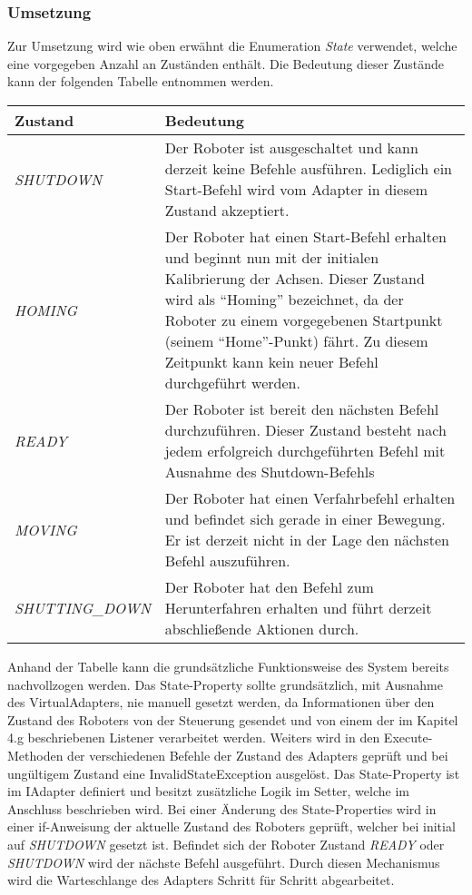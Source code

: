 \subsubsection{Umsetzung}
Zur Umsetzung wird wie oben erwähnt die Enumeration \textit{State} verwendet, welche eine vorgegeben Anzahl an Zuständen enthält. Die Bedeutung dieser Zustände kann der folgenden Tabelle entnommen werden.
\newline
\begin{tabular}{|p{4cm}|p{10cm}|}
\hline \rowcolor{lightgray}
\textbf{Zustand} & \textbf{Bedeutung}\\
\hline
\textit{SHUTDOWN} & Der Roboter ist ausgeschaltet und kann derzeit keine Befehle ausführen. Lediglich ein Start-Befehl wird vom Adapter in diesem Zustand akzeptiert.\\
\hline
\textit{HOMING} & Der Roboter hat einen Start-Befehl erhalten und beginnt nun mit der initialen Kalibrierung der Achsen. Dieser Zustand wird als “Homing” bezeichnet, da der Roboter zu einem vorgegebenen Startpunkt (seinem “Home”-Punkt) fährt. Zu diesem Zeitpunkt kann kein neuer Befehl durchgeführt werden.\\
\hline
\textit{READY} & Der Roboter ist bereit den nächsten Befehl durchzuführen. Dieser Zustand besteht nach jedem erfolgreich durchgeführten Befehl mit Ausnahme des Shutdown-Befehls \\
\hline
\textit{MOVING} & Der Roboter hat einen Verfahrbefehl erhalten und befindet sich gerade in einer Bewegung. Er ist derzeit nicht in der Lage den nächsten Befehl auszuführen.\\
\hline
\textit{SHUTTING\_DOWN} & Der Roboter hat den Befehl zum Herunterfahren erhalten und führt derzeit abschließende Aktionen durch.\\ 
\hline
\end{tabular}
\newline
\newline
Anhand der Tabelle kann die grundsätzliche Funktionsweise des System bereits nachvollzogen werden. Das State-Property sollte grundsätzlich, mit Ausnahme des VirtualAdapters, nie manuell gesetzt werden, da Informationen über den Zustand des Roboters von der Steuerung gesendet und von einem der im Kapitel 4.g beschriebenen Listener verarbeitet werden. Weiters wird in den Execute-Methoden der verschiedenen Befehle der Zustand des Adapters geprüft und bei ungültigem Zustand eine InvalidStateException ausgelöst.
\newline
\newline
Das State-Property ist im IAdapter definiert und besitzt zusätzliche Logik im Setter, welche im Anschluss beschrieben wird. Bei einer Änderung des State-Properties wird in einer if-Anweisung der aktuelle Zustand des Roboters geprüft, welcher bei initial auf \textit{SHUTDOWN} gesetzt ist. Befindet sich der Roboter Zustand \textit{READY} oder \textit{SHUTDOWN} wird der nächste Befehl ausgeführt. Durch diesen Mechanismus wird die Warteschlange des Adapters Schritt für Schritt abgearbeitet.
